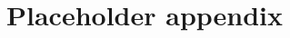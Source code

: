 \documentclass[linenumbers,amsmath,trackchanges]{aastex702}
\begin{document}






\begin{acknowledgments}

\end{acknowledgments}

\begin{contribution}

\end{contribution}



\appendix
\section{Placeholder appendix} \label{sec:appendix}

{}



\end{document}

